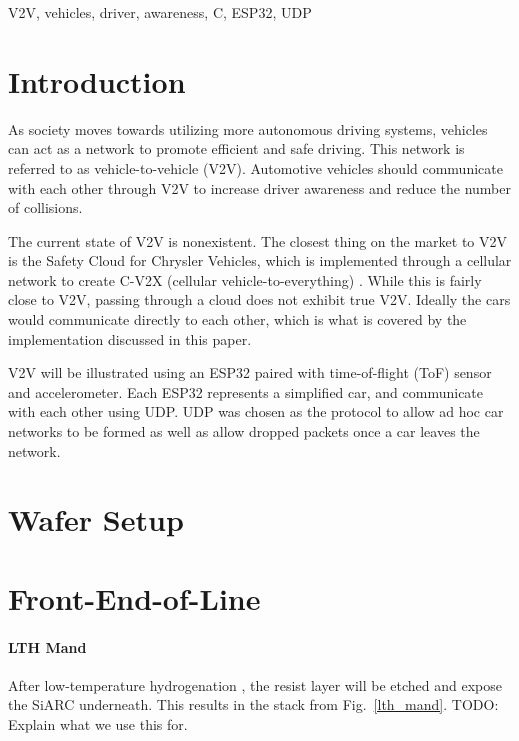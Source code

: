 \documentclass[conference]{IEEEtran}
\begin{document}
\begin{IEEEkeywords}
V2V, vehicles, driver, awareness, C, ESP32, UDP
\end{IEEEkeywords}

\section{Introduction}
As society moves towards utilizing more autonomous driving systems, vehicles can
act as a network to promote efficient and safe driving. This network is referred
to as vehicle-to-vehicle (V2V). Automotive vehicles should communicate with each
other through V2V to increase driver awareness and reduce the number of collisions.

The current state of V2V is nonexistent. The closest thing on the market to V2V
is the Safety Cloud for Chrysler Vehicles, which is implemented through a
cellular network to create C-V2X (cellular vehicle-to-everything) \cite{cv2x}.
While this is fairly close to V2V, passing through a cloud does not exhibit true
V2V. Ideally the cars would communicate directly to each other, which is what is
covered by the implementation discussed in this paper.

V2V will be illustrated using an ESP32 paired with time-of-flight (ToF) sensor
and accelerometer. Each ESP32 represents a simplified car, and communicate with
each other using UDP. UDP was chosen as the protocol to allow ad hoc car networks
to be formed as well as allow dropped packets once a car leaves the network.

\section{Wafer Setup}

\section{Front-End-of-Line}

\paragraph{LTH Mand} After low-temperature hydrogenation \cite{knekr}, the resist layer will
be etched and expose the SiARC underneath. This results in the stack from
Fig.~\ref{lth_mand}.
TODO: Explain what we use this for.
\end{document}
